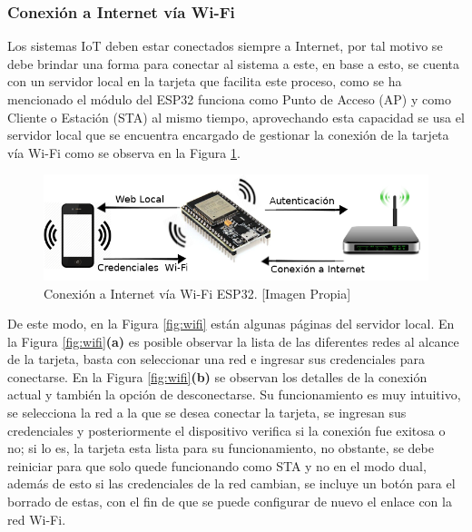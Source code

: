 \subsubsection*{Conexión a Internet vía Wi-Fi}\label{sub:wifi}

Los sistemas IoT deben estar conectados siempre a Internet, por tal motivo se debe brindar una forma para conectar al sistema a este, en base a esto, se cuenta con un servidor local en la tarjeta que facilita este proceso, como se ha mencionado el módulo del ESP32 funciona como Punto de Acceso (AP) y como Cliente o Estación (STA) al mismo tiempo, aprovechando esta capacidad se usa el servidor local que se encuentra encargado de gestionar la conexión de la tarjeta vía Wi-Fi como se observa en la Figura \ref{fig:conexion}.\\

\begin{figure}[!t]
	\centering
	\caption[Conexión a Internet vía Wi-Fi ESP32.]{Conexión a Internet vía Wi-Fi ESP32.  [Imagen Propia]}
	\label{fig:conexion}
	\includegraphics[width=0.9\linewidth]{Imagenes/conexion}
\end{figure}

De este modo, en la Figura \ref{fig:wifi} están algunas páginas del servidor local. En la Figura \ref{fig:wifi}\textbf{(a)} es posible observar la lista de las diferentes redes al alcance de la tarjeta, basta con seleccionar una red e ingresar sus credenciales para conectarse. En la Figura \ref{fig:wifi}\textbf{(b)} se observan los detalles de la conexión actual y también la opción de desconectarse. Su funcionamiento es muy intuitivo, se selecciona la red a la que se desea conectar la tarjeta, se ingresan sus credenciales y posteriormente el dispositivo verifica si la conexión fue exitosa o no; si lo es, la tarjeta esta lista para su funcionamiento, no obstante, se debe reiniciar para que solo quede funcionando como STA y no en el modo dual, además de esto si las credenciales de la red cambian, se incluye un botón para el borrado de estas, con el fin de que se puede configurar de nuevo el enlace con la red Wi-Fi.

